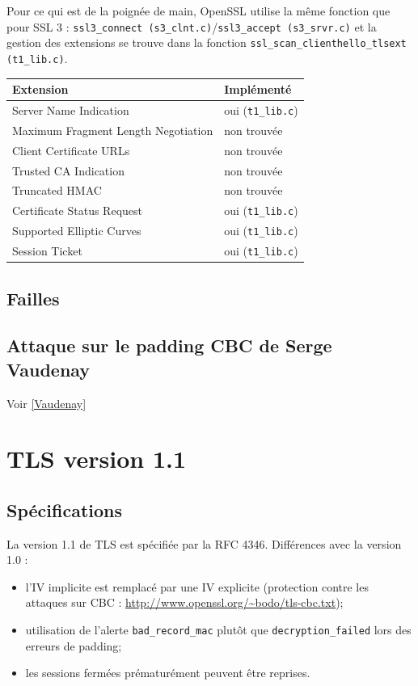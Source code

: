\documentclass[a4paper,11pt,french]{article}
\begin{document}
Pour ce qui est de la poignée de main, OpenSSL utilise la même fonction que pour SSL 3 : \verb+ssl3_connect (s3_clnt.c)+/\verb+ssl3_accept (s3_srvr.c)+ et la gestion des extensions se trouve dans la fonction \verb+ssl_scan_clienthello_tlsext (t1_lib.c)+.

\begin{center}
\begin{tabularx}{16cm}{|X|l|}
\hline
\textbf{Extension}&\textbf{Implémenté}\\ \hline
Server Name Indication& oui (\verb+t1_lib.c+)\\ \hline
Maximum Fragment Length Negotiation& non trouvée\\ \hline
Client Certificate URLs& non trouvée\\ \hline
Trusted CA Indication& non trouvée\\ \hline
Truncated HMAC & non trouvée\\ \hline
Certificate Status Request& oui (\verb+t1_lib.c+)\\ \hline
Supported Elliptic Curves& oui (\verb+t1_lib.c+)\\ \hline
Session Ticket& oui (\verb+t1_lib.c+)\\ \hline
\end{tabularx}
\end{center}


\subsection{Failles}
\subsection{Attaque sur le padding CBC de Serge Vaudenay}
Voir \ref{Vaudenay}

\pagebreak
\section{TLS version 1.1}
\subsection{Spécifications}

La version 1.1 de TLS est spécifiée par la RFC 4346. Différences avec la version 1.0 :
\begin{itemize}
\item l'IV implicite est remplacé par une IV explicite (protection contre les attaques sur CBC : \url{http://www.openssl.org/~bodo/tls-cbc.txt});
\item utilisation de l'alerte \verb+bad_record_mac+ plutôt que \verb+decryption_failed+ lors des erreurs de padding;
\item les sessions fermées prématurément peuvent être reprises.
\end{itemize}
\end{document}
